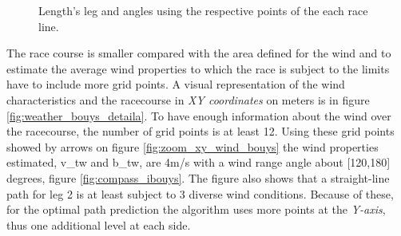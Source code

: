 \begin{figure}[hbt!]
    \centering
  \hfill
  \hfill
\caption{Length's leg and angles using the respective points of the each race line.}
\label{fig:buoysLines_DistAng}    
\end{figure}

The race course is smaller compared with the area defined for the wind and to estimate the average wind properties to which the race is subject to the limits have to include more grid points. A visual representation of the wind characteristics and the racecourse in \textit{XY coordinates} on meters is in figure \ref{fig:weather_bouys_detaila}. To have enough information about the wind over the racecourse, the number of grid points is at least 12. Using these grid points showed by arrows on figure \ref{fig:zoom_xy_wind_bouys} the wind properties estimated, \acrshort{v_tw} and \acrshort{b_tw}, are 4m/s with a wind range angle about [120,180] degrees, figure \ref{fig:compass_ibouys}. The figure also shows that a straight-line path for leg 2 is at least subject to 3 diverse wind conditions. Because of these, for the optimal path prediction the algorithm uses more points at the \textit{Y-axis}, thus one additional level at each side. \par 

